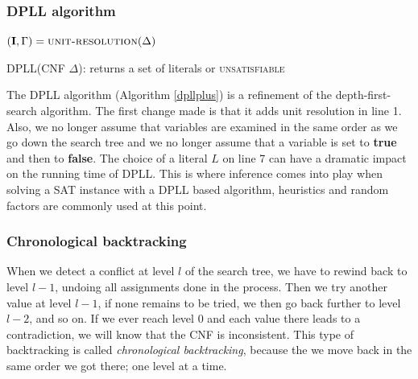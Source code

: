 \documentclass[12pt]{diicc}
\begin{document}
\subsubsection{DPLL algorithm}

\begin{algorithm}
$(\textbf{I},\Gamma)=\textsc{unit-resolution}(\Delta)$\\
\caption{DPLL(CNF $\Delta$): returns a set of literals or \textsc{unsatisfiable}\label{dpllplus}}
\end{algorithm}    

The DPLL algorithm (Algorithm \ref{dpllplus}) is a refinement of the depth-first-search algorithm. The first change made is that it adds unit resolution in line 1. Also, we no longer assume that variables are examined in the same order as we go down the search tree and we no longer assume that a variable is set to \textbf{true} and then to \textbf{false}. The choice of a literal $L$ on line 7 can have a dramatic impact on the running time of DPLL. This is where inference comes into play when solving a SAT instance with a DPLL based algorithm, heuristics and random factors are commonly used at this point. 

\subsubsection{Chronological backtracking}

When we detect a conflict at level $l$ of the search tree, we have to rewind back to level $l-1$, undoing all assignments done in the process. Then we try another value at level $l-1$, if none remains  to be tried, we then go back further to level $l-2$, and so on. If we ever reach level $0$ and each value there leads to a contradiction, we will know that the CNF is inconsistent. This type of backtracking is called \textit{chronological backtracking}, because the we move back in the same order we got there; one level at a time. 
\end{document}
